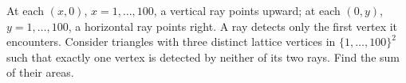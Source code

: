 At each $(x,0)$, $x=1,\ldots,100$, a vertical ray points upward; at each $(0,y)$, $y=1,\ldots,100$, a horizontal ray points right. A ray detects only the first vertex it encounters. Consider triangles with three distinct lattice vertices in $\{1,\ldots,100\}^2$ such that exactly one vertex is detected by neither of its two rays. Find the sum of their areas.
